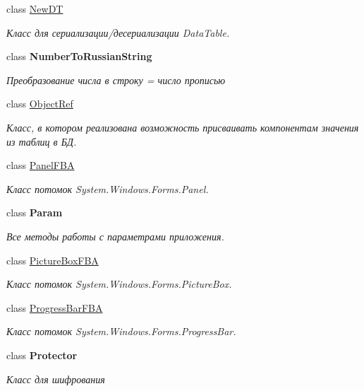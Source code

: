 \begin{DoxyCompactItemize}
class \mbox{\hyperlink{class_f_b_a_1_1_new_d_t}{New\+DT}}
\begin{DoxyCompactList}\small\item\em Класс для сериализации/десериализации Data\+Table. \end{DoxyCompactList}\item 
class {\bfseries Number\+To\+Russian\+String}
\begin{DoxyCompactList}\small\item\em Преобразование числа в строку = число прописью \end{DoxyCompactList}\item 
class \mbox{\hyperlink{class_f_b_a_1_1_object_ref}{Object\+Ref}}
\begin{DoxyCompactList}\small\item\em Класс, в котором реализована возможность присваивать компонентам значения из таблиц в БД. \end{DoxyCompactList}\item 
class \mbox{\hyperlink{class_f_b_a_1_1_panel_f_b_a}{Panel\+F\+BA}}
\begin{DoxyCompactList}\small\item\em Класс потомок System.\+Windows.\+Forms.\+Panel. \end{DoxyCompactList}\item 
class {\bfseries Param}
\begin{DoxyCompactList}\small\item\em Все методы работы с параметрами приложения. \end{DoxyCompactList}\item 
class \mbox{\hyperlink{class_f_b_a_1_1_picture_box_f_b_a}{Picture\+Box\+F\+BA}}
\begin{DoxyCompactList}\small\item\em Класс потомок System.\+Windows.\+Forms.\+Picture\+Box. \end{DoxyCompactList}\item 
class \mbox{\hyperlink{class_f_b_a_1_1_progress_bar_f_b_a}{Progress\+Bar\+F\+BA}}
\begin{DoxyCompactList}\small\item\em Класс потомок System.\+Windows.\+Forms.\+Progress\+Bar. \end{DoxyCompactList}\item 
class {\bfseries Protector}
\begin{DoxyCompactList}\small\item\em Класс для шифрования \end{DoxyCompactList}\item 

\end{DoxyCompactItemize}
